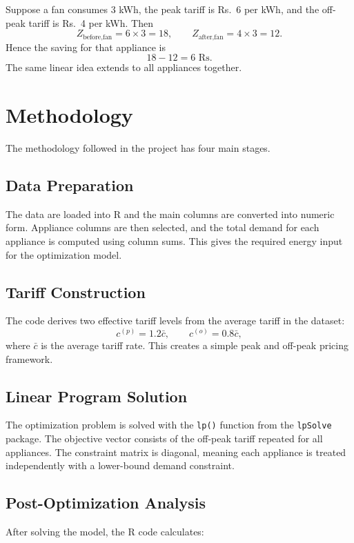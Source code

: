 \documentclass[12pt,a4paper]{article}
\begin{document}
Suppose a fan consumes \(3\) kWh, the peak tariff is Rs.\ 6 per kWh, and the off-peak tariff is Rs.\ 4 per kWh. Then
\[
Z_{\text{before,fan}} = 6 \times 3 = 18,
\qquad
Z_{\text{after,fan}} = 4 \times 3 = 12.
\]
Hence the saving for that appliance is
\[
18-12 = 6 \text{ Rs.}
\]
The same linear idea extends to all appliances together.

\section{Methodology}

The methodology followed in the project has four main stages.

\subsection{Data Preparation}

The data are loaded into R and the main columns are converted into numeric form. Appliance columns are then selected, and the total demand for each appliance is computed using column sums. This gives the required energy input for the optimization model.

\subsection{Tariff Construction}

The code derives two effective tariff levels from the average tariff in the dataset:
\[
c^{(p)} = 1.2\bar{c}, \qquad c^{(o)} = 0.8\bar{c},
\]
where \(\bar{c}\) is the average tariff rate. This creates a simple peak and off-peak pricing framework.

\subsection{Linear Program Solution}

The optimization problem is solved with the \texttt{lp()} function from the \texttt{lpSolve} package. The objective vector consists of the off-peak tariff repeated for all appliances. The constraint matrix is diagonal, meaning each appliance is treated independently with a lower-bound demand constraint.

\subsection{Post-Optimization Analysis}

After solving the model, the R code calculates:
\end{document}
